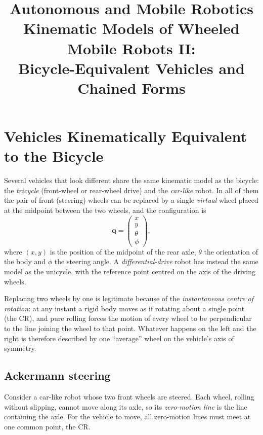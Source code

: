 \documentclass[11pt,a4paper]{article}
\title{\textbf{Autonomous and Mobile Robotics}\\[2pt]
\large Kinematic Models of Wheeled Mobile Robots II:\\ Bicycle-Equivalent Vehicles and Chained Forms}
\date{}
\theoremstyle{definition}
\theoremstyle{plain}
\newcommand{\qv}{\bm{q}}
\begin{document}
\maketitle
\tableofcontents
\bigskip

\section{Vehicles Kinematically Equivalent to the Bicycle}

Several vehicles that look different share the same kinematic model as the bicycle:
the \emph{tricycle} (front-wheel or rear-wheel drive) and the \emph{car-like} robot.
In all of them the pair of front (steering) wheels can be replaced by a single
\emph{virtual} wheel placed at the midpoint between the two wheels, and the configuration is
\[
  \qv=\begin{pmatrix}x\\y\\\theta\\\phi\end{pmatrix},
\]
where $(x,y)$ is the position of the midpoint of the rear axle, $\theta$ the orientation of the body and $\phi$ the steering angle.
A \emph{differential-drive} robot has instead the same model as the unicycle, with the reference point centred on the axis of the driving wheels.

\begin{intuition}
Replacing two wheels by one is legitimate because of the \emph{instantaneous centre of rotation}:
at any instant a rigid body moves as if rotating about a single point (the CR), and pure rolling forces the motion of every wheel to be perpendicular to the line joining the wheel to that point. Whatever happens on the left and the right is therefore described by one ``average'' wheel on the vehicle's axis of symmetry.
\end{intuition}

\subsection{Ackermann steering}

Consider a car-like robot whose two front wheels are steered. Each wheel, rolling without slipping, cannot move along its axle, so its \emph{zero-motion line} is the line containing the axle. For the vehicle to move, all zero-motion lines must meet at one common point, the CR.
\end{document}
